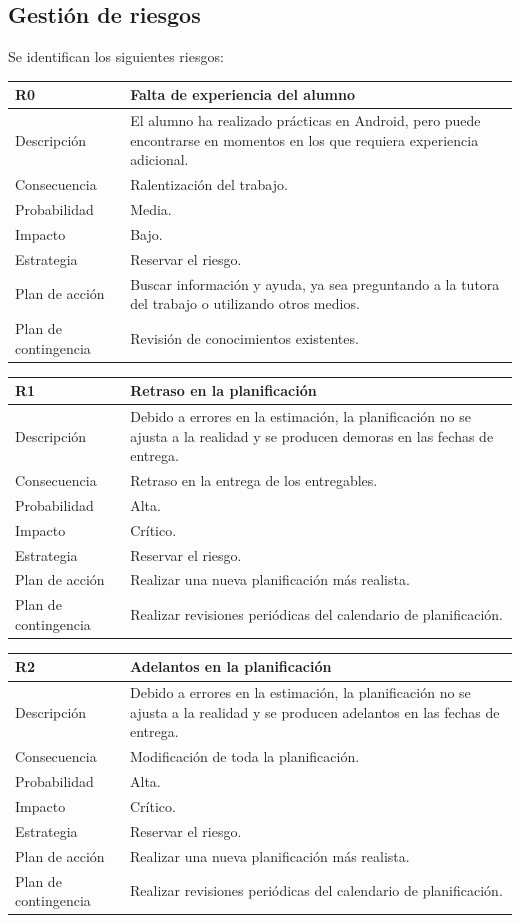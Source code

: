 \documentclass[twoside]{report}
\newcommand\addrow[2]{#1 &#2\\ }
\newcommand\addheading[2]{#1 &#2\\ \hline}
\newcommand\tabularhead{\begin{tabular}{lp{0.7\textwidth}}
\hline
}
\newenvironment{risk}{\tabularhead}
{\hline\end{tabular}}
\begin{document}
\subsection{Gestión de riesgos}

Se identifican los siguientes riesgos:

\begin{risk}
  \addheading{R0}{Falta de experiencia del alumno}
  \addrow{Descripción}{El alumno ha realizado prácticas en Android, pero puede encontrarse en momentos en los que requiera experiencia adicional.}
  \addrow{Consecuencia}{Ralentización del trabajo.}
  \addrow{Probabilidad}{Media.}
  \addrow{Impacto}{Bajo.}
  \addrow{Estrategia}{Reservar el riesgo.}
  \addrow{Plan de acción}{Buscar información y ayuda, ya sea preguntando a la tutora del trabajo o utilizando otros medios.}
  \addrow{Plan de contingencia}{Revisión de conocimientos existentes.}
\end{risk}

\vspace{0.5cm}

\begin{risk}
  \addheading{R1}{Retraso en la planificación}
  \addrow{Descripción}{Debido a errores en la estimación, la planificación no se ajusta a la realidad y se producen demoras en las fechas de entrega.}
  \addrow{Consecuencia}{Retraso en la entrega de los entregables.}
  \addrow{Probabilidad}{Alta.}
  \addrow{Impacto}{Crítico.}
  \addrow{Estrategia}{Reservar el riesgo.}
  \addrow{Plan de acción}{Realizar una nueva planificación más realista. }
  \addrow{Plan de contingencia}{Realizar revisiones periódicas del calendario de planificación.}
\end{risk}

\vspace{0.5cm}

\begin{risk}
  \addheading{R2}{Adelantos en la planificación}
  \addrow{Descripción}{Debido a errores en la estimación, la planificación no se ajusta a la realidad y se producen adelantos en las fechas de entrega.}
  \addrow{Consecuencia}{Modificación de toda la planificación.}
  \addrow{Probabilidad}{Alta.}
  \addrow{Impacto}{Crítico.}
  \addrow{Estrategia}{Reservar el riesgo.}
  \addrow{Plan de acción}{Realizar una nueva planificación más realista. }
  \addrow{Plan de contingencia}{Realizar revisiones periódicas del calendario de planificación.}
\end{risk}

\vspace{0.5cm}
\end{document}
